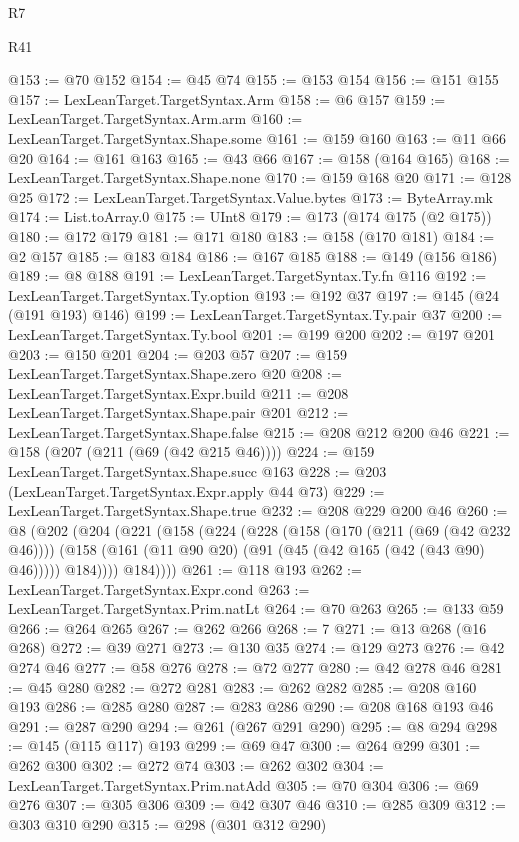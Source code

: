 \begin{lexlean}{R7}
\begin{lexlean}{R41}
\begin{coremodule}
{{{{{{{{{{{{{{{{{{{{{@153 := @70 @152
@154 := @45 @74
@155 := @153 @154
@156 := @151 @155
@157 := LexLeanTarget.TargetSyntax.Arm
@158 := @6 @157
@159 := LexLeanTarget.TargetSyntax.Arm.arm
@160 := LexLeanTarget.TargetSyntax.Shape.some
@161 := @159 @160
@163 := @11 @66 @20
@164 := @161 @163
@165 := @43 @66
@167 := @158 (@164 @165)
@168 := LexLeanTarget.TargetSyntax.Shape.none
@170 := @159 @168 @20
@171 := @128 @25
@172 := LexLeanTarget.TargetSyntax.Value.bytes
@173 := ByteArray.mk
@174 := List.toArray.{0}
@175 := UInt8
@179 := @173 (@174 @175 (@2 @175))
@180 := @172 @179
@181 := @171 @180
@183 := @158 (@170 @181)
@184 := @2 @157
@185 := @183 @184
@186 := @167 @185
@188 := @149 (@156 @186)
@189 := @8 @188
@191 := LexLeanTarget.TargetSyntax.Ty.fn @116
@192 := LexLeanTarget.TargetSyntax.Ty.option
@193 := @192 @37
@197 := @145 (@24 (@191 @193) @146)
@199 := LexLeanTarget.TargetSyntax.Ty.pair @37
@200 := LexLeanTarget.TargetSyntax.Ty.bool
@201 := @199 @200
@202 := @197 @201
@203 := @150 @201
@204 := @203 @57
@207 := @159 LexLeanTarget.TargetSyntax.Shape.zero @20
@208 := LexLeanTarget.TargetSyntax.Expr.build
@211 := @208 LexLeanTarget.TargetSyntax.Shape.pair @201
@212 := LexLeanTarget.TargetSyntax.Shape.false
@215 := @208 @212 @200 @46
@221 := @158 (@207 (@211 (@69 (@42 @215 @46))))
@224 := @159 LexLeanTarget.TargetSyntax.Shape.succ @163
@228 := @203 (LexLeanTarget.TargetSyntax.Expr.apply @44 @73)
@229 := LexLeanTarget.TargetSyntax.Shape.true
@232 := @208 @229 @200 @46
@260 := @8
    (@202
      (@204
        (@221
          (@158
            (@224
              (@228
                (@158
                  (@170 (@211 (@69 (@42 @232 @46))))
                  (@158 (@161 (@11 @90 @20) (@91 (@45 (@42 @165 (@42 (@43 @90) @46))))) @184))))
            @184))))
@261 := @118 @193
@262 := LexLeanTarget.TargetSyntax.Expr.cond
@263 := LexLeanTarget.TargetSyntax.Prim.natLt
@264 := @70 @263
@265 := @133 @59
@266 := @264 @265
@267 := @262 @266
@268 := 7
@271 := @13 @268 (@16 @268)
@272 := @39 @271
@273 := @130 @35
@274 := @129 @273
@276 := @42 @274 @46
@277 := @58 @276
@278 := @72 @277
@280 := @42 @278 @46
@281 := @45 @280
@282 := @272 @281
@283 := @262 @282
@285 := @208 @160 @193
@286 := @285 @280
@287 := @283 @286
@290 := @208 @168 @193 @46
@291 := @287 @290
@294 := @261 (@267 @291 @290)
@295 := @8 @294
@298 := @145 (@115 @117) @193
@299 := @69 @47
@300 := @264 @299
@301 := @262 @300
@302 := @272 @74
@303 := @262 @302
@304 := LexLeanTarget.TargetSyntax.Prim.natAdd
@305 := @70 @304
@306 := @69 @276
@307 := @305 @306
@309 := @42 @307 @46
@310 := @285 @309
@312 := @303 @310 @290
@315 := @298 (@301 @312 @290)
}}}}}}}}}}}}}}}}}}}}}
\end{coremodule}
\end{lexlean}
\end{lexlean}
